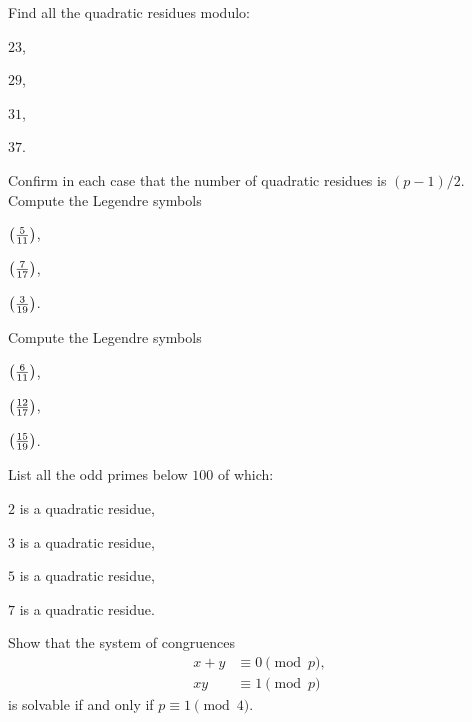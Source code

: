 \exercises

\begin{starter}
  \exercise Find all the quadratic residues modulo:
  \begin{subexenum}
  \item $23$,
  \item $29$,
  \item $31$,
  \item $37$.
  \end{subexenum}
  Confirm in each case that the number of quadratic residues is $(p-1)/2$.
  \exercise Compute the Legendre symbols
  \begin{subexenum}
  \item $\legendre{5}{11}$,
  \item $\legendre{7}{17}$,
  \item $\legendre{3}{19}$.
  \end{subexenum}
  \exercise Compute the Legendre symbols
  \begin{subexenum}
  \item $\legendre{6}{11}$,
  \item $\legendre{12}{17}$,
  \item $\legendre{15}{19}$.
  \end{subexenum}
  \exercise List all the odd primes below $100$ of which:
  \begin{subexenum}
  \item $2$ is a quadratic residue,
  \item $3$ is a quadratic residue,
  \item $5$ is a quadratic residue,
  \item $7$ is a quadratic residue.
  \end{subexenum}
  \exercise Show that the system of congruences
  \begin{align*}
    x+y & \equiv 0 \pmod{p}, \\
     xy & \equiv 1 \pmod{p}
  \end{align*}
  is solvable if and only if $p\equiv 1\pmod{4}$.
\end{starter}

